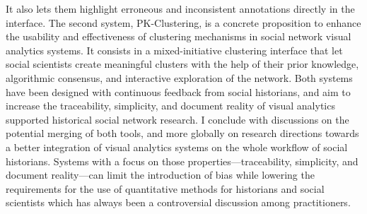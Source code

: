 {It also lets them highlight erroneous and inconsistent annotations directly in the interface.
The second system, PK-Clustering, is a concrete proposition to enhance the usability and effectiveness of clustering mechanisms in social network visual analytics systems. It consists in a mixed-initiative clustering interface that let social scientists create meaningful clusters with the help of their prior knowledge, algorithmic consensus, and interactive exploration of the network.
Both systems have been designed with continuous feedback from social historians, and aim to increase the traceability, simplicity, and document reality of
visual analytics supported historical social network research.
I conclude with discussions on the potential merging of both tools, and more globally on research directions towards a better integration of visual analytics systems on the whole workflow of social historians.
Systems with a focus on those properties---traceability, simplicity, and document reality---can limit the introduction of bias while lowering the requirements for the use of quantitative methods for historians and social scientists which has always been a controversial discussion among practitioners.}

